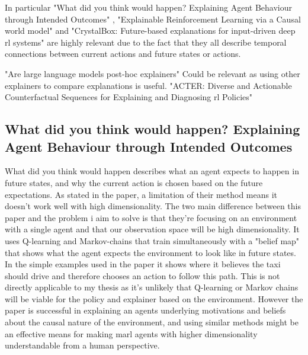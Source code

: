 \documentclass[UKenglish]{uiomasterthesis}
\begin{document}
In particular "What did you think would happen? Explaining Agent Behaviour through Intended Outcomes" \cite{yau2020did}, "Explainable Reinforcement Learning via a Causal world model" \cite{yu2024explainable} and "CrystalBox: Future-based explanations for input-driven deep \ac{rl} systems" \cite{patel2024crystalbox} are highly relevant due to the fact that they all describe temporal connections between current actions and future states or actions.

"Are large language models post-hoc explainers" \cite{kroeger2024large} Could be relevant as using other explainers to compare explanations is useful. "ACTER: Diverse and Actionable Counterfactual Sequences for Explaining and Diagnosing \ac{rl} Policies" \cite{gajcin2024acter} 

\subsection{What did you think would happen? Explaining Agent Behaviour through Intended Outcomes}
What did you think would happen describes what an agent expects to happen in future states, and why the current action is chosen based on the future expectations. As stated in the paper, a limitation of their method means it doesn't work well with high dimensionality. The two main difference between this paper and the problem i aim to solve is that they're focusing on an environment with a single agent and that our observation space will be high dimensionality. It uses Q-learning and Markov-chains that train simultaneously with a "belief map" that shows what the agent expects the environment to look like in future states. In the simple examples used in the paper it shows where it believes the taxi should drive and therefore chooses an action to follow this path. This is not directly applicable to my thesis as it's unlikely that Q-learning or Markov chains will be viable for the policy and explainer based on the environment. However the paper is successful in explaining an agents underlying motivations and beliefs about the causal nature of the environment, and using similar methods might be an effective means for making \ac{marl} agents with higher dimensionality understandable from a human perspective. %

\end{document}
